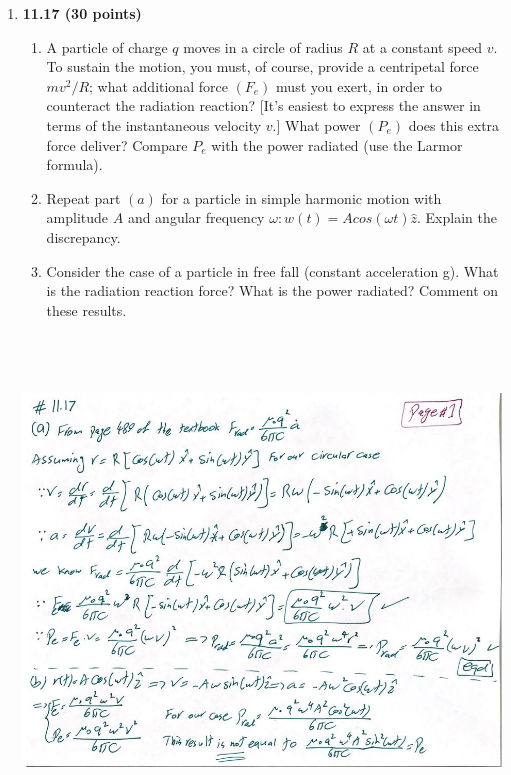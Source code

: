 \documentclass[fleqn]{article}
\begin{document}
\begin{enumerate}
    \pagebreak

    \item \textbf{11.17 (30 points)} 
    \begin{enumerate}
      \item A particle of charge $q$ moves in a circle of radius $R$ at a constant speed $v$. To sustain the motion, 
      you must, of course, provide a centripetal force $m v^2/R$; what additional force $(F_e)$ must you exert, 
      in order to counteract the radiation reaction? [It's easiest to express the answer in terms of the instantaneous
      velocity $v$.] What power $(P_e)$ does this extra force deliver? Compare $P_e$ with the
      power radiated (use the Larmor formula).

      \item Repeat part $(a)$ for a particle in simple harmonic motion with amplitude $A$ and
      angular frequency $\omega: w(t) = A cos(\omega t) \hat{z}$. Explain the discrepancy.


      \item Consider the case of a particle in free fall (constant acceleration g). What is
      the radiation reaction force? What is the power radiated? Comment on these
      results.

    \end{enumerate}
    
    \begin{center}
      \includegraphics[height=13cm, width=15cm]{1117A.JPG}
    \end{center}


\end{enumerate}
\end{document}
